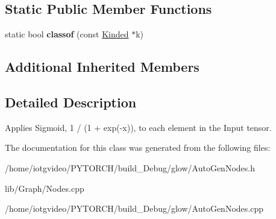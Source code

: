 \subsection*{Static Public Member Functions}
\begin{DoxyCompactItemize}
\item 
\mbox{\label{classglow_1_1_sigmoid_node_a2892c8d0c6f66353daba54cc5d332338}} 
static bool {\bfseries classof} (const \hyperlink{classglow_1_1_kinded}{Kinded} $\ast$k)
\end{DoxyCompactItemize}
\subsection*{Additional Inherited Members}


\subsection{Detailed Description}
Applies Sigmoid, 1 / (1 + exp(-\/x)), to each element in the Input tensor. 

The documentation for this class was generated from the following files\+:\begin{DoxyCompactItemize}
\item 
/home/iotgvideo/\+P\+Y\+T\+O\+R\+C\+H/build\+\_\+\+Debug/glow/Auto\+Gen\+Nodes.\+h\item 
lib/\+Graph/Nodes.\+cpp\item 
/home/iotgvideo/\+P\+Y\+T\+O\+R\+C\+H/build\+\_\+\+Debug/glow/Auto\+Gen\+Nodes.\+cpp\end{DoxyCompactItemize}
